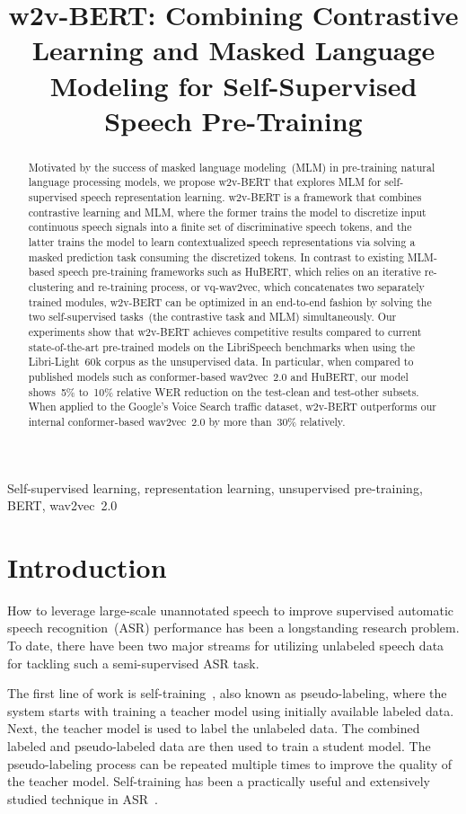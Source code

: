 \documentclass{article}
\title{w2v-BERT: Combining Contrastive Learning and Masked Language Modeling for Self-Supervised Speech Pre-Training}
\begin{document}
\ninept
\maketitle
\begin{abstract}
Motivated by the success of masked language modeling~(MLM) in pre-training natural language processing models, we propose w2v-BERT that explores MLM for self-supervised speech representation learning.
w2v-BERT is a framework that combines contrastive learning and MLM, where the former trains the model to discretize input continuous speech signals into a finite set of discriminative speech tokens, and the latter trains the model to learn contextualized speech representations via solving a masked prediction task consuming the discretized tokens.
In contrast to existing MLM-based speech pre-training frameworks such as HuBERT, which relies on an iterative re-clustering and re-training process, or vq-wav2vec, which concatenates two separately trained modules, w2v-BERT can be optimized in an end-to-end fashion by solving the two self-supervised tasks~(the contrastive task and MLM) simultaneously.
Our experiments show that w2v-BERT achieves competitive results compared to current state-of-the-art pre-trained models on the LibriSpeech benchmarks when using the Libri-Light~60k corpus as the unsupervised data.
In particular, when compared to published models such as conformer-based wav2vec~2.0 and HuBERT, our model shows~5\% to~10\% relative WER reduction on the test-clean and test-other subsets.
When applied to the Google's Voice Search traffic dataset, w2v-BERT outperforms our internal conformer-based wav2vec~2.0 by more than~30\% relatively.
\end{abstract}
\begin{keywords}
Self-supervised learning, representation learning, unsupervised pre-training, BERT, wav2vec~2.0
\end{keywords}


\section{Introduction}
\label{sec:intro}
How to leverage large-scale unannotated speech to improve supervised automatic speech recognition~(ASR) performance has been a longstanding research problem.
To date, there have been two major streams for utilizing unlabeled speech data for tackling such a semi-supervised ASR task.

The first line of work is self-training~\cite{riloff2003learning,yarowsky1995unsupervised,scudder1965probability}, also known as pseudo-labeling, where the system starts with training a teacher model using initially available labeled data.
Next, the teacher model is used to label the unlabeled data.
The combined labeled and pseudo-labeled data are then used to train a student model.
The pseudo-labeling process can be repeated multiple times to improve the quality of the teacher model.
Self-training has been a practically useful and extensively studied technique in ASR~\cite{kahn2020self,synnaeve2020end,li2019semi,parthasarathi2019lessons,novotney2009analysis,zavaliagkos1998utilizing}.
\end{document}
